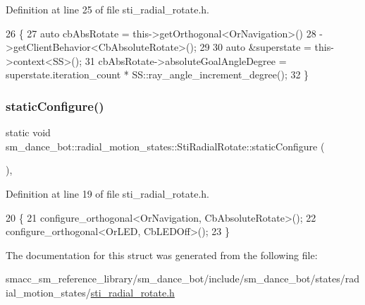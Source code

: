 Definition at line 25 of file sti\+\_\+radial\+\_\+rotate.\+h.


\begin{DoxyCode}
26   \{
27     \textcolor{keyword}{auto} cbAbsRotate = this->getOrthogonal<OrNavigation>()
28                            ->getClientBehavior<CbAbsoluteRotate>();
29 
30     \textcolor{keyword}{auto} &superstate = this->context<SS>();
31     cbAbsRotate->absoluteGoalAngleDegree = superstate.iteration\_count * SS::ray\_angle\_increment\_degree();
32   \}
\end{DoxyCode}
\mbox{\label{structsm__dance__bot_1_1radial__motion__states_1_1StiRadialRotate_a93092bf04595fb025e3a0d154acb037b}} 
\subsubsection{\texorpdfstring{static\+Configure()}{staticConfigure()}}
{\footnotesize\ttfamily static void sm\+\_\+dance\+\_\+bot\+::radial\+\_\+motion\+\_\+states\+::\+Sti\+Radial\+Rotate\+::static\+Configure (\begin{DoxyParamCaption}{ }\end{DoxyParamCaption})\hspace{0.3cm}{\ttfamily [inline]}, {\ttfamily [static]}}



Definition at line 19 of file sti\+\_\+radial\+\_\+rotate.\+h.


\begin{DoxyCode}
20   \{
21     configure\_orthogonal<OrNavigation, CbAbsoluteRotate>();
22     configure\_orthogonal<OrLED, CbLEDOff>();
23   \}
\end{DoxyCode}


The documentation for this struct was generated from the following file\+:\begin{DoxyCompactItemize}
\item 
smacc\+\_\+sm\+\_\+reference\+\_\+library/sm\+\_\+dance\+\_\+bot/include/sm\+\_\+dance\+\_\+bot/states/radial\+\_\+motion\+\_\+states/\hyperlink{include_2sm__dance__bot_2states_2radial__motion__states_2sti__radial__rotate_8h}{sti\+\_\+radial\+\_\+rotate.\+h}\end{DoxyCompactItemize}
